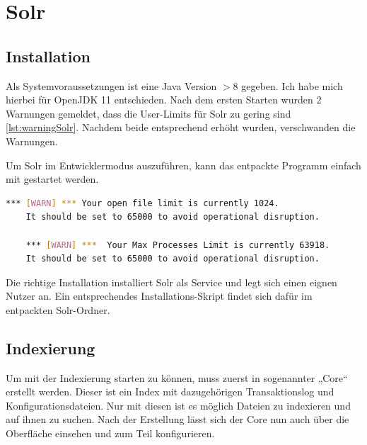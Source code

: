 
\section{Solr}

\subsection{Installation}

Als Systemvoraussetzungen ist eine Java Version $> 8$ gegeben. Ich habe mich hierbei für OpenJDK 11 entschieden. 
Nach dem ersten Starten wurden 2 Warnungen gemeldet, dass die User-Limits für Solr zu gering sind \ref{lst:warningSolr}. Nachdem beide entsprechend erhöht wurden, verschwanden die Warnungen.

Um Solr im Entwicklermodus auszuführen, kann das entpackte Programm einfach mit  gestartet werden. 

\begin{lstlisting}[language=bash, frame=single, label={lst:warningSolr}] 
    *** [WARN] *** Your open file limit is currently 1024.
    It should be set to 65000 to avoid operational disruption.

    *** [WARN] ***  Your Max Processes Limit is currently 63918.
    It should be set to 65000 to avoid operational disruption.
\end{lstlisting}

Die richtige Installation installiert Solr als Service und legt sich einen eignen Nutzer an. Ein entsprechendes Installations-Skript findet sich dafür im entpackten Solr-Ordner.

\subsection{Indexierung}

Um mit der Indexierung starten zu können, muss zuerst in sogenannter „Core“ erstellt werden. Dieser ist ein Index mit dazugehörigen Transaktionslog und Konfigurationsdateien. Nur mit diesen ist es möglich Dateien zu indexieren und auf ihnen zu suchen. Nach der Erstellung lässt sich der Core nun auch über die Oberfläche einsehen und zum Teil konfigurieren.

